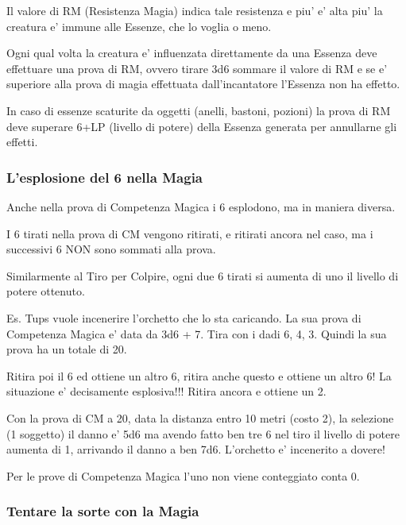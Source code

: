 \documentclass[a4paper,11pt,twoside,openany]{dndbook}
\begin{document}
Il valore di RM (Resistenza Magia) indica tale resistenza e piu' e' alta piu' la creatura e' immune alle Essenze, che lo voglia o meno.

Ogni qual volta la creatura e' influenzata direttamente da una Essenza deve effettuare una prova di RM, ovvero tirare 3d6 sommare il valore di RM e se e' superiore alla prova di magia effettuata dall'incantatore l'Essenza non ha effetto.

In caso di essenze scaturite da oggetti (anelli, bastoni, pozioni)
la prova di RM deve superare 6+LP (livello di potere) della Essenza
generata per annullarne gli effetti.

\subsubsection{L'esplosione del 6 nella Magia}

\label{lesplosione-del-6-nella-magia}

Anche nella prova di Competenza Magica i 6 esplodono, ma in maniera diversa.

I 6 tirati nella prova di CM vengono ritirati, e ritirati ancora nel caso, ma i successivi 6 NON sono sommati alla prova.

Similarmente al Tiro per Colpire, ogni due 6 tirati si aumenta di uno il livello di potere ottenuto.

Es. Tups vuole incenerire l'orchetto che lo sta caricando. La sua prova di Competenza Magica e' data da 3d6 + 7. Tira con i dadi 6, 4, 3. Quindi la sua prova ha un totale di 20.

Ritira poi il 6 ed ottiene un altro 6, ritira anche questo e ottiene un altro 6! La situazione e' decisamente esplosiva!!! Ritira ancora e ottiene un 2.

Con la prova di CM a 20, data la distanza entro 10 metri (costo 2), la selezione (1 soggetto) il danno e' 5d6 ma avendo fatto ben tre 6 nel tiro il livello di potere aumenta di 1, arrivando il danno a ben 7d6. L'orchetto e' incenerito a dovere!

Per le prove di Competenza Magica l'uno non viene conteggiato conta 0.

\subsubsection{Tentare la sorte con la Magia}

\label{tentare-la-sorte-con-la-magia}
\end{document}
